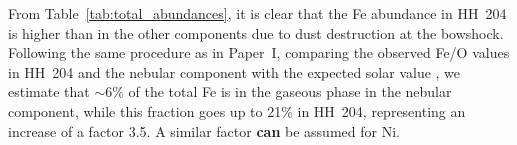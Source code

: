 \documentclass[twocolumn,linenumbers]{aastex63}
\newcommand{\jorge}[1]{{\color{magenta}J: #1}}
\newcommand{\cesar}[1]{{\color{red}C: #1}}
\begin{document}

From Table~\ref{tab:total_abundances}, it is clear that the Fe abundance in HH~204 is higher than in the other components due to dust destruction at the bowshock. Following the same procedure as in Paper~I, comparing the observed Fe/O values in HH~204 and the nebular component with the expected solar value \citep{lodders19}, we estimate that $\sim 6\%$ of the total Fe is in the gaseous phase in the nebular component, while this fraction goes up to 21\% in HH~204, representing an increase of a factor 3.5. A similar factor {\bf can} be assumed for Ni.

\end{document}
